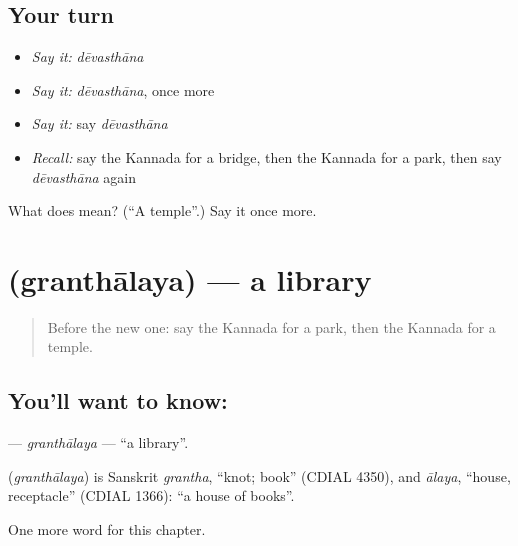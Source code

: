 \subsection*{Your turn}
\begin{itemize}
\raggedright
  \item \emph{Say it:} \emph{dēvasthāna}
  \item \emph{Say it:} \emph{dēvasthāna}, once more
  \item \emph{Say it:} say \emph{dēvasthāna}
  \item \emph{Recall:} say the Kannada for a bridge, then the Kannada for a park, then say \emph{dēvasthāna} again
\end{itemize}

\begin{tcolorbox}[breakable,colback=teal!4,colframe=teal!35!black,title={Before you move on}]
What does  mean? (\textquotedblleft{}A temple\textquotedblright{}.) Say it once more.
\end{tcolorbox}
\section[\texorpdfstring{\kn{ಗ್ರಂಥಾಲಯ} (granthālaya)}{ಗ್ರಂಥಾಲಯ (granthālaya)}]{ (granthālaya) — a library}

\label{lesson:KA-C109-granthalaya}



\begin{quote}
Before the new one: say the Kannada for a park, then the Kannada for a temple.
\end{quote}

\subsection*{You'll want to know: }
\textbf{} — \emph{granthālaya} — \textquotedblleft{}a library\textquotedblright{}.

\begin{cousinweb}
\textbf{} (\emph{granthālaya}) is Sanskrit \emph{grantha}, \textquotedblleft{}knot; book\textquotedblright{} (CDIAL 4350), and \emph{ālaya}, \textquotedblleft{}house, receptacle\textquotedblright{} (CDIAL 1366): \textquotedblleft{}a house of books\textquotedblright{}.
\end{cousinweb}

\begin{grammarlens}[title={What you've built}]
One more word for this chapter.
\end{grammarlens}

